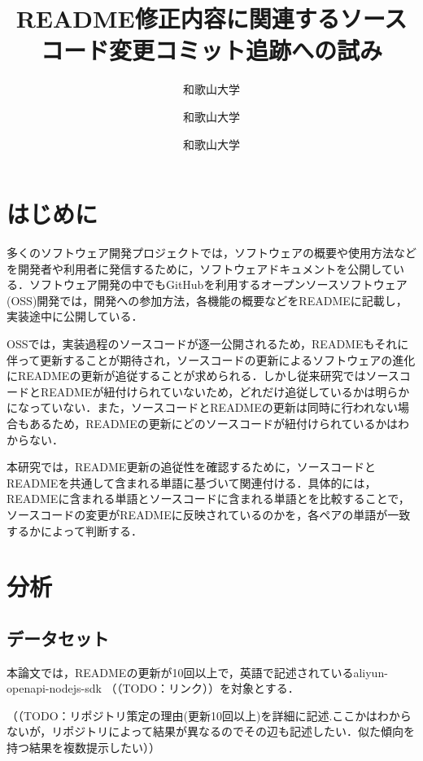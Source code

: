 \documentclass[uplatex,dvipdfmx,a4paper,twocolumn,base=11pt,jbase=11pt,ja=standard]{bxjsarticle}  %
\title{README修正内容に関連するソースコード変更コミット追跡への試み}{Toward tracking source code change commits related to README revision}
\author{和歌山大学}{白﨑 優奈}{Shirasaki Yuna, Wakayama University}
\author{和歌山大学}{伊原 彰紀}{Akinori Ihara, Wakayama University}
\author{和歌山大学}{石岡 直樹}{Naoki Ishioka, Wakayama University}
\begin{document}
\maketitle


\section{はじめに}


多くのソフトウェア開発プロジェクトでは，ソフトウェアの概要や使用方法などを開発者や利用者に発信するために，ソフトウェアドキュメントを公開している．ソフトウェア開発の中でもGitHubを利用するオープンソースソフトウェア(OSS)開発では，開発への参加方法，各機能の概要などをREADMEに記載し，実装途中に公開している．

OSSでは，実装過程のソースコードが逐一公開されるため，READMEもそれに伴って更新することが期待され，ソースコードの更新によるソフトウェアの進化にREADMEの更新が追従することが求められる．しかし従来研究ではソースコードとREADMEが紐付けられていないため，どれだけ追従しているかは明らかになっていない．また，ソースコードとREADMEの更新は同時に行われない場合もあるため，READMEの更新にどのソースコードが紐付けられているかはわからない．

本研究では，README更新の追従性を確認するために，ソースコードとREADMEを共通して含まれる単語に基づいて関連付ける．具体的には，READMEに含まれる単語とソースコードに含まれる単語とを比較することで，ソースコードの変更がREADMEに反映されているのかを，各ペアの単語が一致するかによって判断する．


\section{分析}


\subsection{データセット}



本論文では，READMEの更新が10回以上で，英語で記述されているaliyun-openapi-nodejs-sdk
（（TODO：リンク））を対象とする．

（（TODO：リポジトリ策定の理由(更新10回以上)を詳細に記述.ここかはわからないが，リポジトリによって結果が異なるのでその辺も記述したい．似た傾向を持つ結果を複数提示したい））
\end{document}
